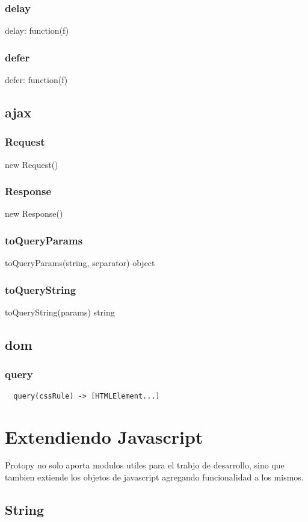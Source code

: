\subsubsection*{delay}
delay: function(f) {
\subsubsection*{defer}
defer: function(f) {

\subsection{ajax}
\subsubsection*{Request}
new Request()
\subsubsection*{Response}
new Response()
\subsubsection*{toQueryParams}
toQueryParams(string, separator) \rightarrow object
\subsubsection*{toQueryString}
toQueryString(params) \rightarrow string

\subsection{dom}
\subsubsection*{query}
\begin{verbatim}
  query(cssRule) -> [HTMLElement...]
\end{verbatim}

\section{Extendiendo Javascript}
Protopy no solo aporta modulos utiles para el trabjo de desarrollo, sino que
tambien extiende los objetos de javascript agregando funcionalidad a los mismos.
\subsection{String}
}}
